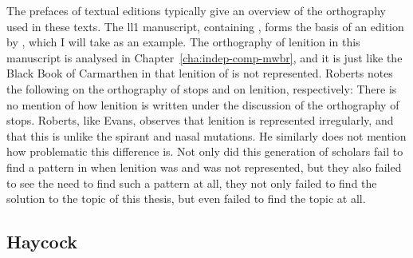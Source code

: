 The prefaces of textual editions typically give an overview of the orthography used in these texts. The \gls{ll1} manuscript, containing , forms the basis of an edition
by \textcite{roberts_brut_1971}, which I will take as an example. The orthography of lenition in this manuscript is analysed in Chapter~\ref{cha:indep-comp-mwbr}, and it is just like the Black Book of Carmarthen in that lenition of  is not represented. Roberts notes the following on the
orthography of stops and on lenition, respectively:
There is no mention of how lenition is written under the discussion of the orthography of stops. Roberts, like Evans, observes that lenition is represented irregularly, and that this is unlike the spirant and nasal mutations. 
He similarly does not mention how problematic this difference is. Not only did this generation of scholars fail to find a pattern in when lenition was and was not represented, but they also failed to see the need to find such a pattern at all, \ie they not only failed to find the solution to the topic of this thesis, but  even failed to find the topic at all.

\subsection{Haycock}
\label{sec:haycock}

